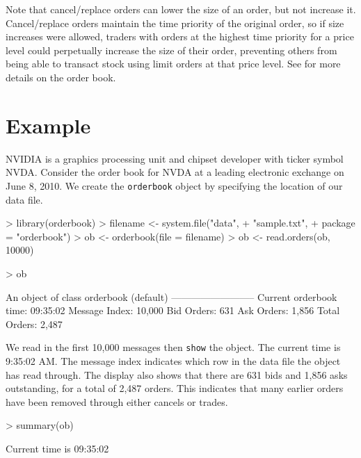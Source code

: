 \documentclass[a4paper]{report}
\begin{document}
\begin{article}
Note that cancel/replace orders can lower the size of an order, but
not increase it. Cancel/replace orders maintain the time priority of
the original order, so if size increases were allowed, traders with
orders at the highest time priority for a price level could
perpetually increase the size of their order, preventing others from
being able to transact stock using limit orders at that price
level. See \cite{johnson:barry} for more details on the order book.

\section{Example}

NVIDIA is a graphics processing unit and chipset developer with ticker
symbol NVDA. Consider the order book for NVDA at a leading electronic
exchange on June 8, 2010. We create the \texttt{orderbook} object by
specifying the location of our data file.

\begin{Schunk}
\begin{Sinput}
> library(orderbook)
> filename <- system.file("data",
+                         "sample.txt",
+                         package = "orderbook")
> ob <- orderbook(file = filename)
> ob <- read.orders(ob, 10000)
\end{Sinput}
\end{Schunk}
\begin{Schunk}
\begin{Sinput}
> ob
\end{Sinput}
\begin{Soutput}
An object of class orderbook (default)
--------------------------
Current orderbook time:    09:35:02 
Message Index:             10,000 
Bid Orders:                631 
Ask Orders:                1,856 
Total Orders:              2,487 
\end{Soutput}
\end{Schunk}

We read in the first 10,000 messages then \texttt{show} the object.
The current time is 9:35:02 AM. The message index indicates which row
in the data file the object has read through. The display also shows
that there are 631 bids and 1,856 asks outstanding, for a total of
2,487 orders. This indicates that many earlier orders have been
removed through either cancels or trades.

\begin{Schunk}
\begin{Sinput}
> summary(ob)
\end{Sinput}
\begin{Soutput}
Current time is 09:35:02 


\end{Soutput}
\end{Schunk}
\end{article}
\end{document}
